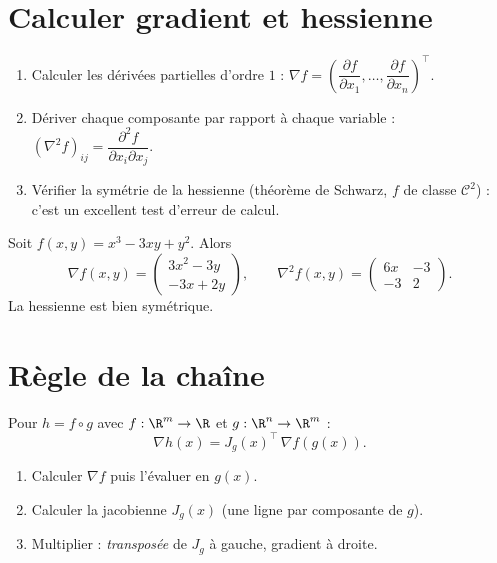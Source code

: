 
\section{Calculer gradient et hessienne}

\begin{methode}
\begin{enumerate}[label=\textbf{Étape \arabic*.}]
  \item Calculer les dérivées partielles d'ordre $1$ : $\nabla f=\left(\dfrac{\partial f}{\partial x_1},\dots,\dfrac{\partial f}{\partial x_n}\right)^{\top}$.
  \item Dériver chaque composante par rapport à chaque variable : $(\nabla^2f)_{ij}=\dfrac{\partial^2f}{\partial x_i\partial x_j}$.
  \item Vérifier la symétrie de la hessienne (théorème de Schwarz, $f$ de classe $\mathcal C^2$) : c'est un excellent test d'erreur de calcul.
\end{enumerate}
\end{methode}

\begin{exemple}
Soit $f(x,y)=x^3-3xy+y^2$. Alors
\[
  \nabla f(x,y)=\begin{pmatrix}3x^2-3y\\-3x+2y\end{pmatrix},\qquad
  \nabla^2f(x,y)=\begin{pmatrix}6x&-3\\-3&2\end{pmatrix}.
\]
La hessienne est bien symétrique.
\end{exemple}

\section{Règle de la chaîne}

\begin{methode}
Pour $h=f\circ g$ avec $f:\R^m\to\R$ et $g:\R^n\to\R^m$ :
\[
  \nabla h(x)=J_g(x)^{\top}\,\nabla f(g(x)).
\]
\begin{enumerate}[label=\textbf{Étape \arabic*.}]
  \item Calculer $\nabla f$ puis l'évaluer en $g(x)$.
  \item Calculer la jacobienne $J_g(x)$ (une ligne par composante de $g$).
  \item Multiplier : \emph{transposée} de $J_g$ à gauche, gradient à droite.
\end{enumerate}
\end{methode}

